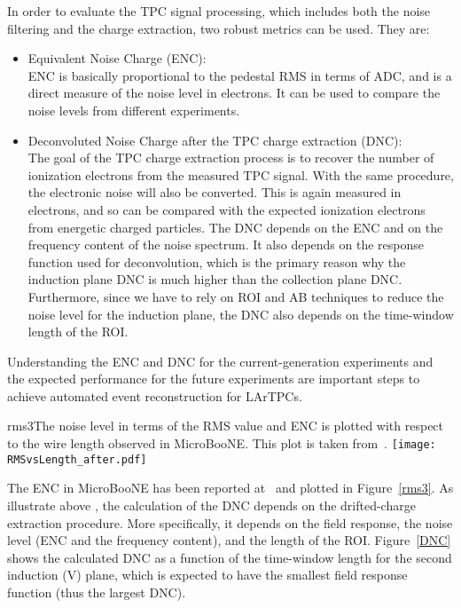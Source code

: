 In order to evaluate the TPC signal processing, which includes both the noise filtering and 
the charge extraction, two robust metrics can be used. %
They are:
\begin{itemize}
\item Equivalent Noise Charge (ENC): \\
  ENC is  basically proportional to the pedestal RMS in terms of ADC, and is a direct 
measure of the noise level in %
electrons. It can be used to compare the 
noise levels from different experiments.
\item Deconvoluted Noise Charge after the TPC charge extraction (DNC): \\
The goal of the TPC charge extraction process is to recover the number of ionization 
electrons from the measured TPC signal. With the same procedure, the electronic noise
will also be converted. %
This is again measured in electrons, %
and so can be compared with 
the expected ionization electrons from energetic charged particles. 
The DNC depends on the ENC and on the frequency content of the noise spectrum. It also depends 
on the response function used for deconvolution, which is the primary reason 
why the induction plane DNC is much higher than the collection plane DNC. Furthermore, since
we have to rely on ROI and AB techniques to reduce the noise level for the induction plane, the
DNC also depends on the time-window length of the ROI. 
\end{itemize}
Understanding the ENC and DNC for the current-generation experiments and the expected 
performance for the future experiments are important steps to achieve automated event 
reconstruction for LArTPCs.

\begin{cdrfigure}{rms3}{The noise level in terms of the RMS value and ENC 
is plotted with respect to the wire length observed in MicroBooNE. 
This plot is taken from~\cite{noise_filter}.}
\texttt{[image: RMSvsLength\_after.pdf]}
\end{cdrfigure}

The ENC in MicroBooNE has been reported at~\cite{noise_filter} and plotted 
in Figure~\ref{rms3}. As illustrate above , the calculation of the DNC depends on the 
drifted-charge extraction procedure. More specifically, it depends on the field 
response, the noise level (ENC and the frequency content), and the length of the ROI. 
Figure~\ref{DNC} shows the calculated DNC as a function of the time-window length 
for the second induction (V) plane, which is expected to have the smallest field 
response function (thus the largest DNC). 

